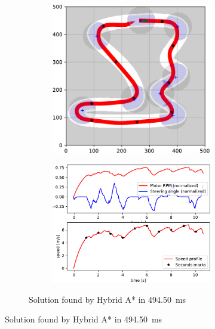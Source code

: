 \begin{figure}[!tbp]%
	\centering
	
	\begin{subfigure}[t]{\textwidth}
		\begin{subfigure}[t]{0.45\textwidth}
			\includegraphics[width=\textwidth]{../img/experiments/tornado-hybrid_astar-trajectory}
		\end{subfigure}
		\hfill
		\begin{subfigure}[t]{0.45\textwidth}
			\includegraphics[width=\textwidth]{../img/experiments/tornado-hybrid_astar-actuators}
		\end{subfigure}
		\caption{Solution found by Hybrid A* in \SI{494.50}{\milli\second}}
		\label{fig:solution_tornado-hybrid_astar}	
	\end{subfigure}
	

\end{figure}
